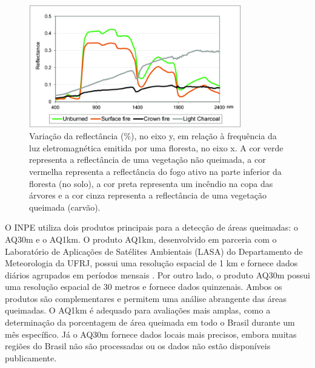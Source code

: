 \documentclass[cic,tc]{iiufrgs}
\begin{document}
\begin{figure}
    \caption{Variação da reflectância (\%), no eixo y, em relação à frequência da luz eletromagnética emitida por uma floresta, no eixo x. A cor verde representa a reflectância de uma vegetação não queimada, a cor vermelha representa a reflectância do fogo ativo na parte inferior da floresta (no solo), a cor preta representa um incêndio na copa das árvores e a cor cinza representa a reflectância de uma vegetação queimada (carvão).}
    \begin{center}
        \includegraphics[width=25em]{Reflectance-spectra-for-unburned-vegetation-canopy-and-fires-affecting-different}
    \end{center}
    \label{fig:reflectancia_espectral}
\end{figure}

O INPE utiliza dois produtos principais para a detecção de áreas queimadas: o AQ30m e o AQ1km. O produto AQ1km, desenvolvido em parceria com o Laboratório de Aplicações de Satélites Ambientais (LASA) do Departamento de Meteorologia da UFRJ, possui uma resolução espacial de 1 km e fornece dados diários agrupados em períodos mensais \citep{SiteAQ1km}. Por outro lado, o produto AQ30m possui uma resolução espacial de 30 metros e fornece dados quinzenais. Ambos os produtos são complementares e permitem uma análise abrangente das áreas queimadas. O AQ1km é adequado para avaliações mais amplas, como a determinação da porcentagem de área queimada em todo o Brasil durante um mês específico. Já o AQ30m fornece dados locais mais precisos, embora muitas regiões do Brasil não são processadas ou os dados não estão disponíveis publicamente.
\end{document}
